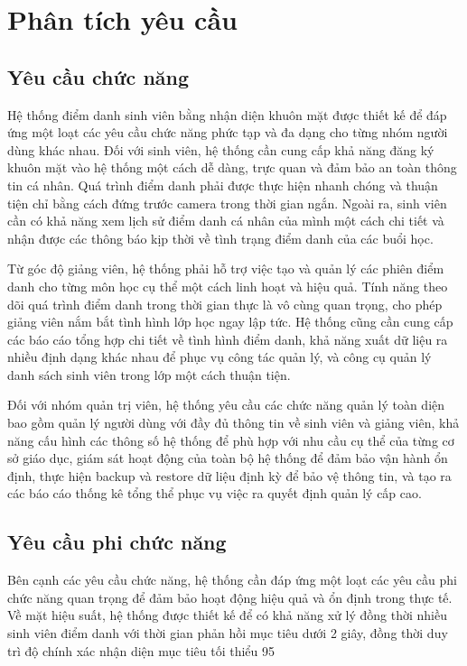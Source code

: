 \documentclass[12pt,a4paper]{report}
\begin{document}
\section{Phân tích yêu cầu}
\subsection{Yêu cầu chức năng}
Hệ thống điểm danh sinh viên bằng nhận diện khuôn mặt được thiết kế để đáp ứng một loạt các yêu cầu chức năng phức tạp và đa dạng cho từng nhóm người dùng khác nhau. Đối với sinh viên, hệ thống cần cung cấp khả năng đăng ký khuôn mặt vào hệ thống một cách dễ dàng, trực quan và đảm bảo an toàn thông tin cá nhân. Quá trình điểm danh phải được thực hiện nhanh chóng và thuận tiện chỉ bằng cách đứng trước camera trong thời gian ngắn. Ngoài ra, sinh viên cần có khả năng xem lịch sử điểm danh cá nhân của mình một cách chi tiết và nhận được các thông báo kịp thời về tình trạng điểm danh của các buổi học.

Từ góc độ giảng viên, hệ thống phải hỗ trợ việc tạo và quản lý các phiên điểm danh cho từng môn học cụ thể một cách linh hoạt và hiệu quả. Tính năng theo dõi quá trình điểm danh trong thời gian thực là vô cùng quan trọng, cho phép giảng viên nắm bắt tình hình lớp học ngay lập tức. Hệ thống cũng cần cung cấp các báo cáo tổng hợp chi tiết về tình hình điểm danh, khả năng xuất dữ liệu ra nhiều định dạng khác nhau để phục vụ công tác quản lý, và công cụ quản lý danh sách sinh viên trong lớp một cách thuận tiện.

Đối với nhóm quản trị viên, hệ thống yêu cầu các chức năng quản lý toàn diện bao gồm quản lý người dùng với đầy đủ thông tin về sinh viên và giảng viên, khả năng cấu hình các thông số hệ thống để phù hợp với nhu cầu cụ thể của từng cơ sở giáo dục, giám sát hoạt động của toàn bộ hệ thống để đảm bảo vận hành ổn định, thực hiện backup và restore dữ liệu định kỳ để bảo vệ thông tin, và tạo ra các báo cáo thống kê tổng thể phục vụ việc ra quyết định quản lý cấp cao.

\subsection{Yêu cầu phi chức năng}
Bên cạnh các yêu cầu chức năng, hệ thống cần đáp ứng một loạt các yêu cầu phi chức năng quan trọng để đảm bảo hoạt động hiệu quả và ổn định trong thực tế. Về mặt hiệu suất, hệ thống được thiết kế để có khả năng xử lý đồng thời nhiều sinh viên điểm danh với thời gian phản hồi mục tiêu dưới 2 giây, đồng thời duy trì độ chính xác nhận diện mục tiêu tối thiểu 95%
\end{document}
